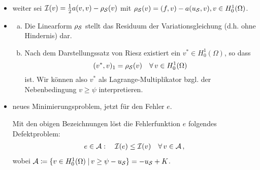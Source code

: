 \begin{itemize}
\item weiter sei $\mathcal I(v) = \frac 12 a(v,v)-\rho_{\mathcal S}(v)$ mit $\rho_{\mathcal S} (v) = (f,v)-a(u_{\mathcal S},v), v \in H^1_0(\Omega)$.

\item
\begin{bem}
\begin{enumerate}[(a)]
\item Die Linearform $\rho_{\mathcal S}$ stellt das Residuum der Variationsgleichung (d.h. ohne Hindernis) dar.
\item Nach dem Darstellungssatz von Riesz existiert ein $v^* \in H^1_0(\Omega)$, so dass
\[
	(v^*,v)_1 = \rho_{\mathcal S} (v) \quad\forall \, v \in H^1_0(\Omega)
\]
ist. Wir können also $v^*$ als Lagrange-Multiplikator bzgl. der Nebenbedingung $v \ge \psi$ interpretieren.
\end{enumerate}
\end{bem}

\item neues Minimierungsproblem, jetzt für den Fehler $e$.
\begin{satz}
Mit den obigen Bezeichnungen löst die Fehlerfunktion $e$ folgendes Defektproblem:
\begin{align}\label{eq:4.2}
	e \in \mathcal A:\quad  \mathcal I(e) \le \mathcal I(v) \quad \forall \, v \in \mathcal A \, ,
\end{align}
wobei $\mathcal A \coloneqq \{v \in H^1_0(\Omega) \;\vert\, v \ge \psi-u_{\mathcal S}\} = -u_{\mathcal S} + K$.
\end{satz}


\end{itemize}
